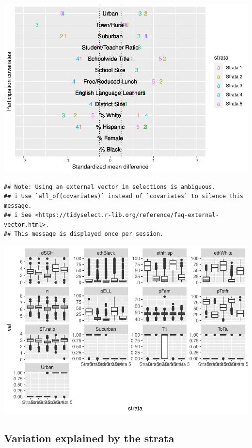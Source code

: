 \documentclass[
  english,
  man,floatsintext]{apa6}
\begin{document}
\includegraphics{5---Analysis_files/figure-latex/unnamed-chunk-8-1.pdf}

\begin{verbatim}
## Note: Using an external vector in selections is ambiguous.
## i Use `all_of(covariates)` instead of `covariates` to silence this message.
## i See <https://tidyselect.r-lib.org/reference/faq-external-vector.html>.
## This message is displayed once per session.
\end{verbatim}

\includegraphics{5---Analysis_files/figure-latex/unnamed-chunk-9-1.pdf}

\hypertarget{variation-explained-by-the-strata}{%
\subsection{Variation explained by the strata}\label{variation-explained-by-the-strata}}
\end{document}
